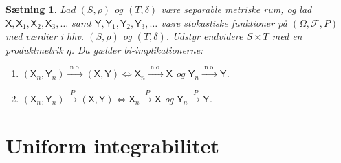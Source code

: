 \documentclass{article}
\newcommand{\1}{\mathbbm{1}}
\newcommand{\X}{\mathsf{X}}
\newcommand{\Y}{\mathsf{Y}}
\theoremstyle{boxed}
\newtheorem{proposition}[theorem]{Sætning}
\begin{document}
\begin{theorem-box}
    \begin{proposition}
        Lad $(S, \rho)$ og $(T, \delta)$ være separable metriske rum, og lad $\X, \X_1, \X_2, \X_3, \ldots$ samt $\Y, \Y_1, \Y_2, \Y_3, \ldots$ være stokastiske funktioner på $(\Omega, \mathcal{F}, P)$ med værdier i hhv. $(S, \rho)$ og $(T, \delta)$.
        Udstyr endvidere $S \times T$ med en produktmetrik $\eta$.
        Da gælder bi-implikationerne:
        \begin{enumerate}
            \item[\textnormal{(i)}] $\left(\X_n, \Y_n\right) \xrightarrow{\text { n.o. }}(\X, \Y) \Longleftrightarrow \X_n \xrightarrow{\text { n.o. }} \X$ og $\Y_n \xrightarrow{\text { n.o. }} \Y$.
            \item[\textnormal{(ii)}] $\left(\X_n, \Y_n\right) \xrightarrow{P}(\X, \Y) \Longleftrightarrow \X_n \xrightarrow{P} \X$ og $\Y_n \xrightarrow{P} \Y$.
        \end{enumerate}
    \end{proposition}
\end{theorem-box}
\section{Uniform integrabilitet}
\end{document}
